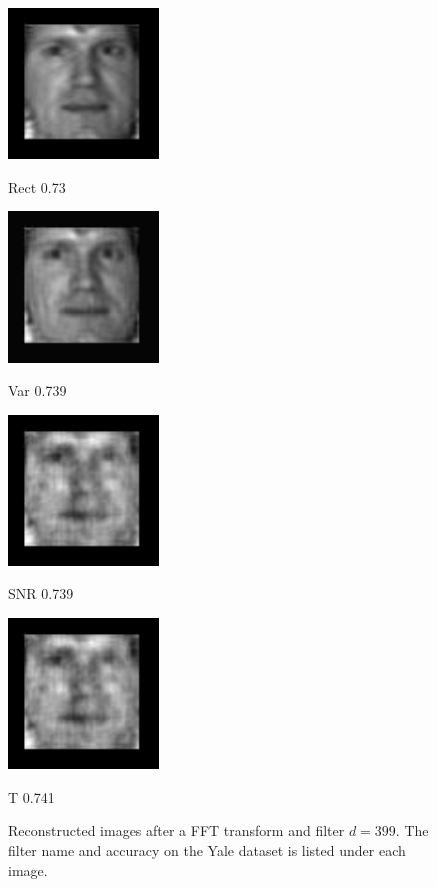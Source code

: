 \documentclass{article}
\begin{document}
\begin{figure} [!htb]

\begin{minipage}[b]{.48\linewidth}
  \centering
  \centerline{\includegraphics[width=4.0cm]{recon/rectF_399_yale}}
  \centerline{Rect 0.73}\medskip
\end{minipage}
\hfill
\begin{minipage}[b]{0.48\linewidth}
  \centering
  \centerline{\includegraphics[width=4.0cm]{recon/varF_399_yale}}
  \centerline{Var 0.739}\medskip
\end{minipage}
%
\begin{minipage}[b]{.48\linewidth}
  \centering
  \centerline{\includegraphics[width=4.0cm]{recon/snrF_399_yale}}
  \centerline{SNR 0.739}\medskip
\end{minipage}
\hfill
\begin{minipage}[b]{0.48\linewidth}
  \centering
  \centerline{\includegraphics[width=4.0cm]{recon/tF_399_yale}}
  \centerline{T 0.741}\medskip
\end{minipage}
%
\caption{Reconstructed images after a FFT transform and filter $d = 399$. The filter name and accuracy on the 
Yale dataset is listed under each image.}
\label{fig:reconFFT}
%
\end{figure}
\end{document}
